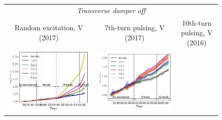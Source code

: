 \documentclass[aps
,prstab
,reprint
,longbibliography
,preprintnumbers
,showkeys
,amsfonts,amssymb,amsmath
,floatfix
]{revtex4-1}
\newcommand{\seventhtp}{7th-turn pulsing}
\newcommand{\tenthtp}{10th-turn pulsing}
\newlength{\thirdwidth}
\begin{document}
\begin{figure}
  \begin{tabular}{ccc}
    \multicolumn{3}{c}{\emph{Transverse damper off}} \\
    Random excitation, V (2017) & \seventhtp, V (2017) & \tenthtp, V
                                                         (2016) \\
    \includegraphics[width=\thirdwidth]{2017_emitv_avg_rel_vran_no_damper.png}&
    \includegraphics[width=\thirdwidth]{2017_emitv_avg_rel_v7th_no_damper_no_text.png} &

\end{tabular}
\end{figure}
\end{document}
